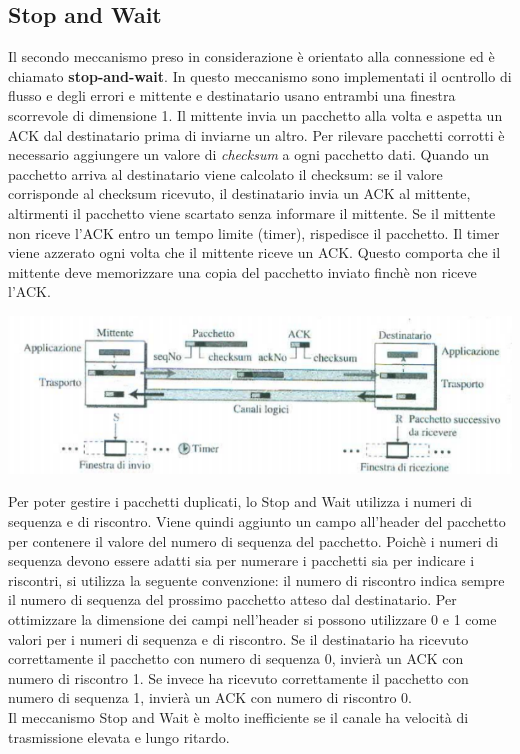 \documentclass[12pt]{report}
\begin{document}
	\subsection{Stop and Wait}
	Il secondo meccanismo preso in considerazione è orientato alla connessione ed è chiamato \textbf{stop-and-wait}. In questo meccanismo sono implementati il ocntrollo di flusso e degli errori e mittente e destinatario usano entrambi una finestra scorrevole di dimensione 1. Il mittente invia un pacchetto alla volta e aspetta un ACK dal destinatario prima di inviarne un altro. Per rilevare pacchetti corrotti è necessario aggiungere un valore di \textit{checksum} a ogni pacchetto dati. Quando un pacchetto arriva al destinatario viene calcolato il checksum: se il valore corrisponde al checksum ricevuto, il destinatario invia un ACK al mittente, altirmenti il pacchetto viene scartato senza informare il mittente. Se il mittente non riceve l'ACK entro un tempo limite (timer), rispedisce il pacchetto. Il timer viene azzerato ogni volta che il mittente riceve un ACK. Questo comporta che il mittente deve memorizzare una copia del pacchetto inviato finchè non riceve l'ACK.
	\begin{center}
		\includegraphics[scale=0.5]{assets/stop-wait.png}
	\end{center}
	Per poter gestire i pacchetti duplicati, lo Stop and Wait utilizza i numeri di sequenza e di riscontro. Viene quindi aggiunto un campo all'header del pacchetto per contenere il valore del numero di sequenza del pacchetto. Poichè i numeri di sequenza devono essere adatti sia per numerare i pacchetti sia per indicare i riscontri, si utilizza la seguente convenzione: il numero di riscontro indica sempre il numero di sequenza del prossimo pacchetto atteso dal destinatario. Per ottimizzare la dimensione dei campi nell'header si possono utilizzare 0 e 1 come valori per i numeri di sequenza e di riscontro. Se il destinatario ha ricevuto correttamente il pacchetto con numero di sequenza 0, invierà un ACK con numero di riscontro 1. Se invece ha ricevuto correttamente il pacchetto con numero di sequenza 1, invierà un ACK con numero di riscontro 0.
	\vspace{\baselineskip}\\
	Il meccanismo Stop and Wait è molto inefficiente se il canale ha velocità di trasmissione elevata e lungo ritardo.
\end{document}
